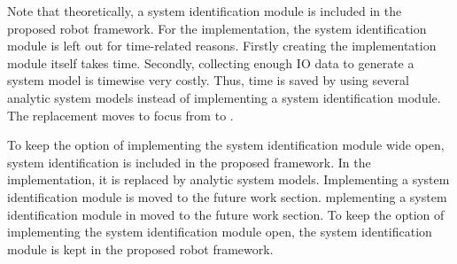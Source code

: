 

Note that theoretically, a system identification module is included in the proposed robot framework. For the implementation, the system identification module is left out for time-related reasons. Firstly creating the implementation module itself takes time. Secondly, collecting enough \ac{IO} data to generate a system model is timewise very costly. Thus, time is saved by using several analytic system models instead of implementing a system identification module. The replacement moves to focus from  to .\bs

To keep the option of implementing the system identification module wide open, system identification is included in the proposed framework. In the implementation, it is replaced by analytic system models. Implementing a system identification module is moved to the future work section.\bs
mplementing a system identification module in moved to the future work section. To keep the option of implementing the system identification module open, the system identification module is kept in the proposed robot framework.\bs
